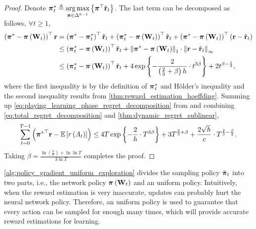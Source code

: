 \begin{proof}
Denote ${\boldsymbol{\pi}}_t^* \triangleq \operatorname*{arg\,max}\limits_{{\boldsymbol{\pi}} \in \Delta^{h-1}}{\left\{ {\boldsymbol{\pi}}^\top \hat{{\mathbf{r}}}_t\right\}}$. The last term can be decomposed as follows, $\forall t \ge 1$,
\begin{equation}
\label{eq:playing_learning_phase_regret_decomposition}
\begin{split}
    \left( {{\boldsymbol{\pi}}^*} - {\boldsymbol{\pi}}\left( {\mathbf{W}}_t \right) \right)^\top {\mathbf{r}} &= \left( {{\boldsymbol{\pi}}^*} - {{\boldsymbol{\pi}}_t^*} \right)^\top \hat{{\mathbf{r}}}_t + \left( {{\boldsymbol{\pi}}_t^*} - {\boldsymbol{\pi}}\left( {\mathbf{W}}_t \right) \right)^\top \hat{{\mathbf{r}}}_t + \left( {{\boldsymbol{\pi}}^*} - {\boldsymbol{\pi}}\left( {\mathbf{W}}_t \right) \right)^\top \left( {\mathbf{r}} - \hat{{\mathbf{r}}}_t \right) \\
    &\le \left( {{\boldsymbol{\pi}}_t^*} - {\boldsymbol{\pi}}\left( {\mathbf{W}}_t \right) \right)^\top \hat{{\mathbf{r}}}_t  + \left\| {\boldsymbol{\pi}}^* - {\boldsymbol{\pi}}\left( {\mathbf{W}}_t \right) \right\|_1 \cdot \left\| {\mathbf{r}} - \hat{{\mathbf{r}}}_t \right\|_\infty \\
    &\le \left( {{\boldsymbol{\pi}}_t^*} - {\boldsymbol{\pi}}\left( {\mathbf{W}}_t \right) \right)^\top \hat{{\mathbf{r}}}_t + 4 \exp\left\{ - \frac{2}{ \left(\frac{2}{3} + \beta \right) h } \cdot t^{3\beta} \right\} + 2 t^{\beta - \frac{1}{3}},
\end{split}
\end{equation}
where the first inequality is by the definition of ${\boldsymbol{\pi}}_t^*$ and  H{\"o}lder's inequality and the second inequality results from \cref{thm:reward_estimation_hoeffding}. Summing up \cref{eq:playing_learning_phase_regret_decomposition} from and
combining \cref{eq:total_regret_decomposition} and \cref{thm:dynamic_regret_sublinear},
\begin{equation*}
\begin{split}
    \sum\limits_{t=0}^{T-1}{ \left( {{\boldsymbol{\pi}}^*}^\top {\mathbf{r}} - {\mathbb{E}} \left[ r\left(A_t\right) \right] \right) } \le  4 T \exp\left\{ - \frac{2}{h} \cdot  T^{3\beta} \right\} + 3 T^{\frac{2}{3} + \beta} + \frac{2 \sqrt{h}}{ c} \cdot T^{\frac{2}{3} - \frac{\beta}{2}}.
\end{split}
\end{equation*}
Taking $\beta = \frac{ \ln{\left(\frac{h}{6}\right) + \ln{\ln{T}} } }{ 3 \ln{T}} $ completes the proof.
\end{proof}

\cref{alg:policy_gradient_uniform_exploration} divides the sampling policy $\tilde{{\boldsymbol{\pi}}}_t$ into two parts, i.e., the network policy ${\boldsymbol{\pi}}\left( {\mathbf{W}}_t \right)$ and an uniform policy. Intuitively, when the reward estimation is very inaccurate, updates can probably hurt the neural network policy.  Therefore, an uniform policy is used to guarantee that every action can be sampled for enough many times, which will provide accurate reward estimations for learning. 

